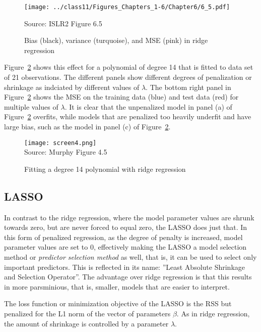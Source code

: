 \begin{figure}
\centering
\texttt{[image: ../class11/Figures\_Chapters\_1-6/Chapter6/6\_5.pdf]}

\scriptsize Source: ISLR2 Figure 6.5 \normalsize \\

\caption[Bias, variance, and MSE in ridge regression]{Bias (black), variance (turquoise), and MSE (pink) in ridge regression}
\label{fig:ridgebias}
\end{figure}

Figure~\ref{fig:ridgemultiple} shows this effect for a polynomial of degree 14 that is fitted to data set of 21 observations. The different panels show different degrees of penalization or shrinkage as indciated by different values of $\lambda$. The bottom right panel in Figure~\ref{fig:ridgemultiple} shows the MSE on the training data (blue) and test data (red) for multiple values of $\lambda$. It is clear that the unpenalized model in panel (a) of Figure~\ref{fig:ridgemultiple} overfits, while models that are penalized too heavily underfit and have large bias, such as the model in panel (c) of Figure~\ref{fig:ridgemultiple}. 

\begin{figure}
\centering
\texttt{[image: screen4.png]}\\
\scriptsize Source: Murphy Figure 4.5

\caption{Fitting a degree 14 polynomial with ridge regression}
\label{fig:ridgemultiple}
\end{figure}

\subsection{LASSO}

In contrast to the ridge regression, where the model parameter values are shrunk towards zero, but are never forced to equal zero, the LASSO does just that. In this form of penalized regression, as the degree of penalty is increased, model parameter values are set to 0, effectively making the LASSO a model selection method or \emph{predictor selection method} as well, that is, it can be used to select only important predictors. This is reflected in its name: ''Least Absolute Shrinkage and Selection Operator''. The advantage over ridge regression is that this results in more parsminious, that is, smaller, models that are easier to interpret.

The loss function or minimization objective of the LASSO is the RSS but penalized for the L1 norm of the vector of parameters $\beta$. As in ridge regression, the amount of shrinkage is controlled by a parameter $\lambda$.

